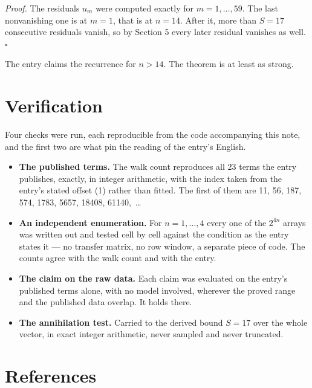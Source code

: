 \documentclass[11pt]{article}
\theoremstyle{definition}
\begin{document}
{\itshape Proof.} The residuals $u_m$ were computed exactly for $m = 1,\dots,59$. The last nonvanishing one is at $m = 1$, that is at $n = 14$. After it, more than $S = 17$ consecutive residuals vanish, so by Section 5 every later residual vanishes as well. $\square$

The entry claims the recurrence for $n > 14$. The theorem is at least as strong.

\section{Verification}

Four checks were run, each reproducible from the code accompanying this note, and the first two are what pin the reading of the entry's English.

\begin{itemize}

\item {\bfseries The published terms.} The walk count reproduces all 23 terms the entry publishes, exactly, in integer arithmetic, with the index taken from the entry's stated offset (1) rather than fitted. The first of them are 11, 56, 187, 574, 1783, 5657, 18408, 61140,~\dots

\item {\bfseries An independent enumeration.} For $n = 1,\dots,4$ every one of the $2^{4n}$ arrays was written out and tested cell by cell against the condition as the entry states it --- no transfer matrix, no row window, a separate piece of code. The counts agree with the walk count and with the entry.

\item {\bfseries The claim on the raw data.} Each claim was evaluated on the entry's published terms alone, with no model involved, wherever the proved range and the published data overlap. It holds there.

\item {\bfseries The annihilation test.} Carried to the derived bound $S = 17$ over the whole vector, in exact integer arithmetic, never sampled and never truncated.

\end{itemize}

\section{References}
\end{document}
